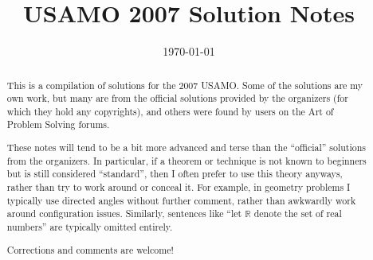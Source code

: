 \documentclass[11pt]{scrartcl}
\title{USAMO 2007 Solution Notes}
\date{\today}
\begin{document}
\maketitle

\begin{abstract}
This is a compilation of solutions
for the 2007 USAMO.
Some of the solutions are my own work,
but many are from the official solutions provided by the organizers
(for which they hold any copyrights),
and others were found by users on the Art of Problem Solving forums.

These notes will tend to be a bit more advanced and terse than the ``official''
solutions from the organizers.
In particular, if a theorem or technique is not known to beginners
but is still considered ``standard'', then I often prefer to
use this theory anyways, rather than try to work around or conceal it.
For example, in geometry problems I typically use directed angles
without further comment, rather than awkwardly work around configuration issues.
Similarly, sentences like ``let $\mathbb{R}$ denote the set of real numbers''
are typically omitted entirely.

Corrections and comments are welcome!
\end{abstract}

\tableofcontents
\newpage

\addtocounter{section}{-1}
\end{document}

